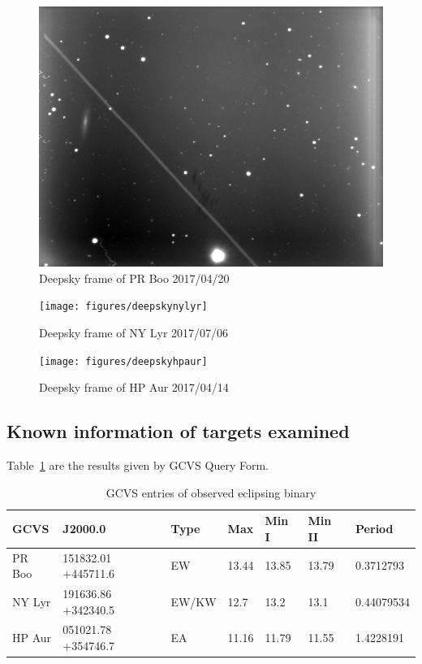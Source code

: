 \begin{figure}[h]
    \centering
    \includegraphics[width=\columnwidth]{figures/deepskyprboo}
    \caption{Deepsky frame of PR Boo 2017/04/20}
\label{fig:deepskyprboo}
\end{figure}
\begin{figure}[h]
    \centering
    \texttt{[image: figures/deepskynylyr]}
    \caption{Deepsky frame of NY Lyr 2017/07/06}
\label{fig:deepskynylyr}
\end{figure}
\begin{figure}[h]
    \centering
    \texttt{[image: figures/deepskyhpaur]}
    \caption{Deepsky frame of HP Aur 2017/04/14}
\label{fig:deepskyhpaur}
\end{figure}

\subsection{Known information of targets examined}
Table~\ref{tab:gcvs} are the results given by GCVS Query Form.
\begin{table}[h]
    \centering
    \begin{tabular}{l l l l l l l }
        \toprule
        GCVS & J2000.0 & Type & Max & Min I & Min II & Period \\ \bottomrule
        PR Boo & 151832.01 +445711.6 & EW & 13.44 & 13.85 & 13.79 & 0.3712793 \\ \midrule
        NY Lyr & 191636.86 +342340.5 & EW/KW & 12.7 & 13.2 & 13.1 & 0.44079534 \\ \midrule
        HP Aur & 051021.78 +354746.7 & EA & 11.16  & 11.79 & 11.55 & 1.4228191 \\   
    \bottomrule
    \end{tabular}
    \caption{GCVS entries of observed eclipsing binary}
\label{tab:gcvs}
\end{table}

